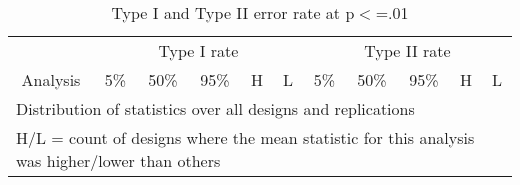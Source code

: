 \documentclass[10pt]{report}
\begin{document}
\begin{table}[ht]
\begin{center}
\caption{Type I and Type II error rate at p$<$=.01}
\begin{tabular}{lrrrrrrrrrr}
\toprule
&\multicolumn{5}{c}{Type I rate}&\multicolumn{5}{c}{Type II rate} \\
\cmidrule(l{.75em}){2-6}\cmidrule(l{.75em}){7-11}
\multicolumn{1}{c}{Analysis}&\multicolumn{1}{c}{5\%}&\multicolumn{1}{c}{50\%}&\multicolumn{1}{c}{95\%}&\multicolumn{1}{c}{H}&\multicolumn{1}{c}{L}&\multicolumn{1}{c}{5\%}&\multicolumn{1}{c}{50\%}&\multicolumn{1}{c}{95\%}&\multicolumn{1}{c}{H}&\multicolumn{1}{c}{L} \\
\midrule

\bottomrule
\multicolumn{11}{l}{\footnotesize{Distribution of statistics over all designs and replications}} \\
\multicolumn{11}{l}{\footnotesize{H/L = count of designs where the mean statistic for this analysis was higher/lower than others}} \\
\end{tabular}
\end{center}
\end{table}


\end{document}
